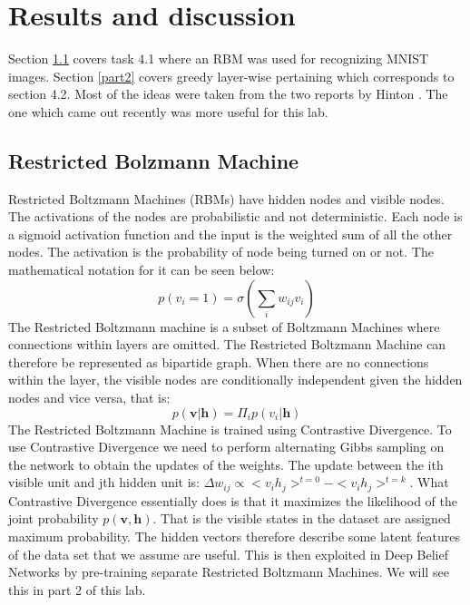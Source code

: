 \documentclass[a4paper]{article}
\begin{document}
\section{Results and discussion}
Section \ref{part1} covers task 4.1 where an RBM was used for recognizing MNIST images. Section \ref{part2} covers greedy layer-wise pertaining which corresponds to section 4.2. Most of the ideas were taken from the two reports by Hinton \cite{hinton2006fast} \cite{hinton2012practical}. The one which came out recently was more useful for this lab. 

\subsection{Restricted Bolzmann Machine}
\label{part1}
Restricted Boltzmann Machines (RBMs) have hidden nodes and visible nodes. The activations of the nodes are probabilistic and not deterministic. Each node is a sigmoid activation function and the input is the weighted sum of all the other nodes. The activation is the probability of node being turned on or not. The mathematical notation for it can be seen below:
$$
p(v_i = 1) = \sigma (\sum_i w_{ij}v_{i})
$$
The Restricted Boltzmann machine is a subset of Boltzmann Machines where connections within layers are omitted. The Restricted Boltzmann Machine can therefore be represented as bipartide graph. When there are no connections within the layer, the visible nodes are conditionally independent given the hidden nodes and vice versa, that is:
$$
p(\textbf{v} |  \textbf{h}) = \Pi_{i}p(v_i | \textbf{h})
$$
The Restricted Boltzmann Machine is trained using Contrastive Divergence. To use Contrastive Divergence we need to perform alternating Gibbs sampling on the network to obtain the updates of the weights. The update between the ith visible unit and jth hidden unit is: $\Delta w_{ij} \propto <v_i h_j>^{t=0} - <v_i h_j>^{t=k}$. What Contrastive Divergence essentially does is that it maximizes the likelihood of the joint probability $p(\textbf{v}, \textbf{h})$. That is the visible states in the dataset are assigned maximum probability. The hidden vectors therefore describe some latent features of the data set that we assume are useful. This is then exploited in Deep Belief Networks by pre-training separate Restricted Boltzmann Machines. We will see this in part 2 of this lab.
\end{document}
